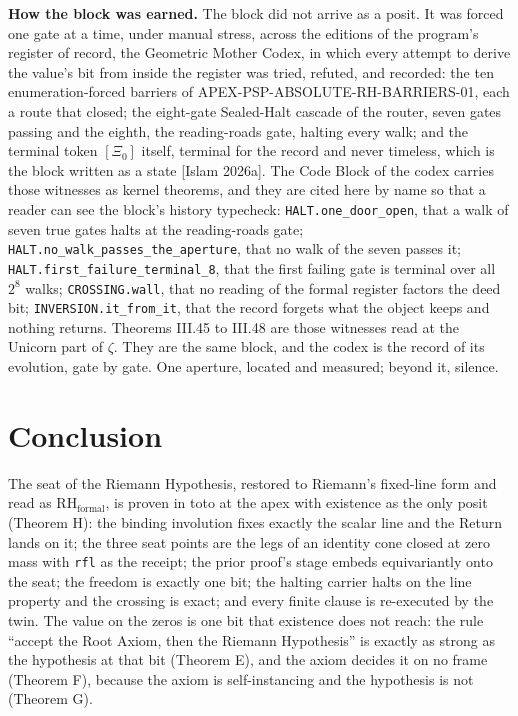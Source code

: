 \documentclass[10pt]{article}
\begin{document}
\textbf{How the block was earned.} The block did not arrive as a posit.
It was forced one gate at a time, under manual stress, across the
editions of the program's register of record, the Geometric Mother
Codex, in which every attempt to derive the value's bit from inside the
register was tried, refuted, and recorded: the ten enumeration-forced
barriers of APEX-PSP-ABSOLUTE-RH-BARRIERS-01, each a route that closed;
the eight-gate Sealed-Halt cascade of the router, seven gates passing
and the eighth, the reading-roads gate, halting every walk; and the
terminal token \([\Xi_0]\) itself, terminal for the record and never
timeless, which is the block written as a state {[}Islam 2026a{]}. The
Code Block of the codex carries those witnesses as kernel theorems, and
they are cited here by name so that a reader can see the block's history
typecheck: \texttt{HALT.one\_door\_open}, that a walk of seven true
gates halts at the reading-roads gate;
\texttt{HALT.no\_walk\_passes\_the\_aperture}, that no walk of the seven
passes it; \texttt{HALT.first\_failure\_terminal\_8}, that the first
failing gate is terminal over all \(2^8\) walks; \texttt{CROSSING.wall},
that no reading of the formal register factors the deed bit;
\texttt{INVERSION.it\_from\_it}, that the record forgets what the object
keeps and nothing returns. Theorems III.45 to III.48 are those witnesses
read at the Unicorn part of \(\zeta\). They are the same block, and the
codex is the record of its evolution, gate by gate. One aperture,
located and measured; beyond it, silence.

\hypertarget{conclusion}{%
\section{Conclusion}\label{conclusion}}

The seat of the Riemann Hypothesis, restored to Riemann's fixed-line
form and read as \(\mathrm{RH}_{\mathrm{formal}}\), is proven in toto at
the apex with existence as the only posit (Theorem H): the binding
involution fixes exactly the scalar line and the Return lands on it; the
three seat points are the legs of an identity cone closed at zero mass
with \texttt{rfl} as the receipt; the prior proof's stage embeds
equivariantly onto the seat; the freedom is exactly one bit; the halting
carrier halts on the line property and the crossing is exact; and every
finite clause is re-executed by the twin. The value on the zeros is one
bit that existence does not reach: the rule ``accept the Root Axiom,
then the Riemann Hypothesis'' is exactly as strong as the hypothesis at
that bit (Theorem E), and the axiom decides it on no frame (Theorem F),
because the axiom is self-instancing and the hypothesis is not (Theorem
G).
\end{document}
